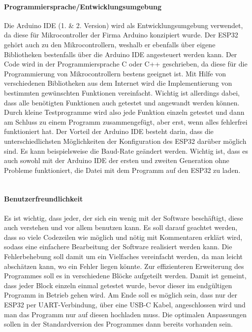 \documentclass[titlepage,12pt,twoside]{article}
\begin{document}
\paragraph{Programmiersprache/Entwicklungsumgebung}
\hfill \break
\hfill \break
Die Arduino IDE (1. \& 2. Version) wird als Entwicklungsumgebung verwendet, da diese für Mikrocontroller der Firma Arduino 
konzipiert wurde. Der ESP32 gehört auch zu den Mikrocontrollern, weshalb er ebenfalls über eigene Bibliotheken bestenfalls 
über die Arduino IDE angesteuert werden kann. Der Code wird in der Programmiersprache C oder C++ geschrieben, da diese für 
die Programmierung von Mikrocontrollern bestens geeignet ist. Mit Hilfe von verschiedenen Bibliotheken aus dem Internet wird 
die Implementierung von bestimmten gewünschten Funktionen vereinfacht. Wichtig ist allerdings dabei, dass alle benötigten 
Funktionen auch getestet und angewandt werden können. Durch kleine Testprogramme wird also jede Funktion einzeln getestet und 
dann am Schluss zu einem Programm zusammengefügt, aber erst, wenn alles fehlerfrei funktioniert hat. Der Vorteil der Arduino 
IDE besteht darin, dass die unterschiedlichsten Möglichkeiten der Konfiguration des ESP32 darüber möglich sind. Es kann 
beispielsweise die Baud-Rate geändert werden. Wichtig ist, dass es auch sowohl mit der Arduino IDE der ersten und zweiten 
Generation ohne Probleme funktioniert, die Datei mit dem Programm auf den ESP32 zu laden. \\
\\
\paragraph{Benutzerfreundlichkeit}
\hfill \break
\hfill \break
Es ist wichtig, dass jeder, der sich ein wenig mit der Software beschäftigt, diese auch verstehen und vor allem benutzen kann. 
Es soll darauf geachtet werden, dass so viele Codezeilen wie möglich und nötig mit Kommentaren erklärt wird, sodass eine 
einfachere Bearbeitung der Software realisiert werden kann. Die Fehlerbehebung soll damit um ein Vielfaches vereinfacht werden, 
da man leicht abschätzen kann, wo ein Fehler liegen könnte. Zur effizienteren Erweiterung des Programmes soll es in 
verschiedene Blöcke aufgeteilt werden. Damit ist gemeint, dass jeder Block einzeln einmal getestet wurde, bevor dieser im 
endgültigen Programm in Betrieb gehen wird. Am Ende soll es möglich sein, dass nur der ESP32 per UART-Verbindung, über eine 
USB-C Kabel, angeschlossen wird und man das Programm nur auf diesen hochladen muss. Die optimalen Anpassungen sollen in der 
Standardversion des Programmes dann bereits vorhanden sein. \\
\\
\end{document}
